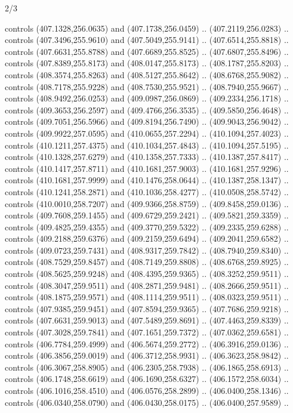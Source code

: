 \begin{flagdescription}{2/3}
\begin{scope}[xshift=0.5\flaglength,yshift=0.5\flagwidth,scale=\flagwidth/495.65]
\begin{scope}[y=0.8pt, x=0.8pt, yscale=-1,shift={(-463.76,-309.78)}]
  controls (407.1328,256.0635) and (407.1738,256.0459) .. (407.2119,256.0283) ..
  controls (407.3496,255.9610) and (407.5049,255.9141) .. (407.6514,255.8818) ..
  controls (407.6631,255.8788) and (407.6689,255.8525) .. (407.6807,255.8496) ..
  controls (407.8389,255.8173) and (408.0147,255.8173) .. (408.1787,255.8203) ..
  controls (408.3574,255.8263) and (408.5127,255.8642) .. (408.6768,255.9082) ..
  controls (408.7178,255.9228) and (408.7530,255.9521) .. (408.7940,255.9667) ..
  controls (408.9492,256.0253) and (409.0987,256.0869) .. (409.2334,256.1718) ..
  controls (409.3653,256.2597) and (409.4766,256.3535) .. (409.5850,256.4648) ..
  controls (409.7051,256.5966) and (409.8194,256.7490) .. (409.9043,256.9042) ..
  controls (409.9922,257.0595) and (410.0655,257.2294) .. (410.1094,257.4023) ..
  controls (410.1211,257.4375) and (410.1034,257.4843) .. (410.1094,257.5195) ..
  controls (410.1328,257.6279) and (410.1358,257.7333) .. (410.1387,257.8417) ..
  controls (410.1417,257.8711) and (410.1681,257.9003) .. (410.1681,257.9296) ..
  controls (410.1681,257.9999) and (410.1476,258.0644) .. (410.1387,258.1347) ..
  controls (410.1241,258.2871) and (410.1036,258.4277) .. (410.0508,258.5742) ..
  controls (410.0010,258.7207) and (409.9366,258.8759) .. (409.8458,259.0136) ..
  controls (409.7608,259.1455) and (409.6729,259.2421) .. (409.5821,259.3359) ..
  controls (409.4825,259.4355) and (409.3770,259.5322) .. (409.2335,259.6288) ..
  controls (409.2188,259.6376) and (409.2159,259.6494) .. (409.2041,259.6582) ..
  controls (409.0723,259.7431) and (408.9317,259.7842) .. (408.7940,259.8340) ..
  controls (408.7529,259.8457) and (408.7149,259.8808) .. (408.6768,259.8925) ..
  controls (408.5625,259.9248) and (408.4395,259.9365) .. (408.3252,259.9511) ..
  controls (408.3047,259.9511) and (408.2871,259.9481) .. (408.2666,259.9511) ..
  controls (408.1875,259.9571) and (408.1114,259.9511) .. (408.0323,259.9511) ..
  controls (407.9385,259.9451) and (407.8594,259.9365) .. (407.7686,259.9218) ..
  controls (407.6631,259.9013) and (407.5489,259.8691) .. (407.4463,259.8339) ..
  controls (407.3028,259.7841) and (407.1651,259.7372) .. (407.0362,259.6581) ..
  controls (406.7784,259.4999) and (406.5674,259.2772) .. (406.3916,259.0136) ..
  controls (406.3856,259.0019) and (406.3712,258.9931) .. (406.3623,258.9842) ..
  controls (406.3067,258.8905) and (406.2305,258.7938) .. (406.1865,258.6913) ..
  controls (406.1748,258.6619) and (406.1690,258.6327) .. (406.1572,258.6034) ..
  controls (406.1016,258.4510) and (406.0576,258.2899) .. (406.0400,258.1346) ..
  controls (406.0340,258.0790) and (406.0430,258.0175) .. (406.0400,257.9589) ..

\end{scope}
\end{scope}
\end{flagdescription}
